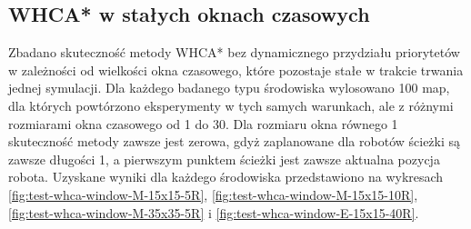 \subsection{WHCA* w stałych oknach czasowych}
Zbadano skuteczność metody WHCA* bez dynamicznego przydziału priorytetów w zależności od wielkości okna czasowego, które pozostaje stałe w trakcie trwania jednej symulacji.
Dla każdego badanego typu środowiska wylosowano 100 map, dla których powtórzono eksperymenty w tych samych warunkach, ale z różnymi rozmiarami okna czasowego od 1 do 30.
Dla rozmiaru okna równego 1 skuteczność metody zawsze jest zerowa, gdyż zaplanowane dla robotów ścieżki są zawsze długości 1, a pierwszym punktem ścieżki jest zawsze aktualna pozycja robota.
Uzyskane wyniki dla każdego środowiska przedstawiono na wykresach \ref{fig:test-whca-window-M-15x15-5R}, \ref{fig:test-whca-window-M-15x15-10R}, \ref{fig:test-whca-window-M-35x35-5R} i \ref{fig:test-whca-window-E-15x15-40R}.

